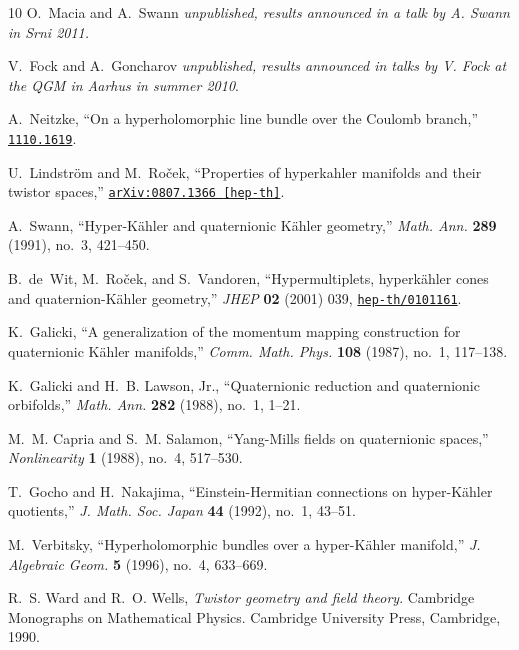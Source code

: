 \documentclass[12pt,reqno]{article}
\numberwithin{equation}{section}
\numberwithin{equation}{section}
\begin{document}
\begin{thebibliography}{10}
O.~Macia and A.~Swann {\em unpublished, results announced in a talk by A. Swann
  in Srni 2011.}

V.~Fock and A.~Goncharov {\em unpublished, results announced in talks by V.
  Fock at the QGM in Aarhus in summer 2010}.

A.~Neitzke, ``{On a hyperholomorphic line bundle over the Coulomb branch},''
\href{http://www.arXiv.org/abs/1110.1619}{{\tt 1110.1619}}.

U.~Lindstr{\"o}m and M.~Ro\v{c}ek, ``{Properties of hyperkahler manifolds and
  their twistor spaces},''
\href{http://www.arXiv.org/abs/0807.1366}{{\tt arXiv:0807.1366 {[hep-th]}}}.

A.~Swann, ``Hyper-{K}\"ahler and quaternionic {K}\"ahler geometry,'' {\em Math.
  Ann.} {\bf 289} (1991), no.~3, 421--450.

B.~de~Wit, M.~Ro\v{c}ek, and S.~Vandoren, ``{H}ypermultiplets, hyperk{\"a}hler
  cones and quaternion-{K\"a}hler geometry,'' {\em JHEP} {\bf 02} (2001) 039,
\href{http://www.arXiv.org/abs/hep-th/0101161}{{\tt hep-th/0101161}}.

K.~Galicki, ``A generalization of the momentum mapping construction for
  quaternionic {K}\"ahler manifolds,'' {\em Comm. Math. Phys.} {\bf 108}
  (1987), no.~1, 117--138.

K.~Galicki and H.~B. Lawson, Jr., ``Quaternionic reduction and quaternionic
  orbifolds,'' {\em Math. Ann.} {\bf 282} (1988), no.~1, 1--21.

M.~M. Capria and S.~M. Salamon, ``Yang-{M}ills fields on quaternionic spaces,''
  {\em Nonlinearity} {\bf 1} (1988), no.~4, 517--530.

T.~Gocho and H.~Nakajima, ``Einstein-{H}ermitian connections on
  hyper-{K}\"ahler quotients,'' {\em J. Math. Soc. Japan} {\bf 44} (1992),
  no.~1, 43--51.

M.~Verbitsky, ``Hyperholomorphic bundles over a hyper-{K}\"ahler manifold,''
  {\em J. Algebraic Geom.} {\bf 5} (1996), no.~4, 633--669.

R.~S. Ward and R.~O. Wells, {\em {T}wistor geometry and field theory}.
\newblock Cambridge Monographs on Mathematical Physics. Cambridge University
  Press, Cambridge, 1990.


\end{thebibliography}
\end{document}
